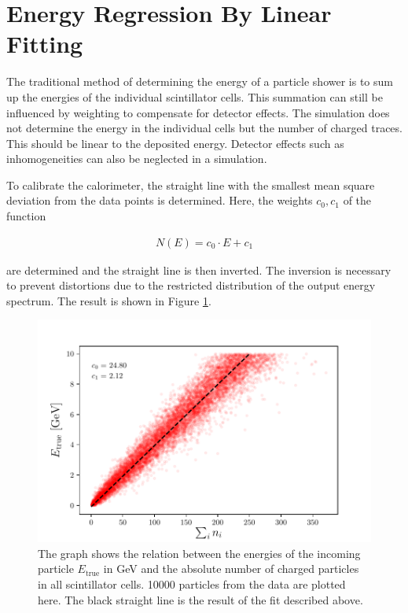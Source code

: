 \documentclass[12pt, a4paper]{thesis}
\begin{document}

\section{Energy Regression By Linear Fitting}
\label{sec:orgd10286d}

The traditional method of determining the energy of a particle shower
is to sum up the energies of the individual scintillator cells. This
summation can still be influenced by weighting to compensate for
detector effects. The simulation does not determine the energy in the
individual cells but the number of charged traces. This should be
linear to the deposited energy. Detector effects such as
inhomogeneities can also be neglected in a simulation.

To calibrate the calorimeter, the straight line with the smallest mean
square deviation from the data points is determined. Here, the weights
\(c_0, c_1\) of the function

\begin{align}
N(E) = c_0 \cdot E + c_1
\end{align}

are determined and the straight line is then inverted. The inversion
is necessary to prevent distortions due to the restricted distribution
of the output energy spectrum. The result is shown in Figure
\ref{e-vs-sum_n_fit}.


\begin{figure}[H]
\centering
\includegraphics[width=.9\linewidth]{../images/e-vs-sum_n_fit.pdf}
\caption{ The graph shows the relation between the energies of the
  incoming particle \(E_{\text{true}}\) in GeV and the absolute number
  of charged particles in all scintillator cells.  10000 particles
  from the data are plotted here. The black straight line is the
  result of the fit described above.}
\label{e-vs-sum_n_fit}
\end{figure}
\end{document}
